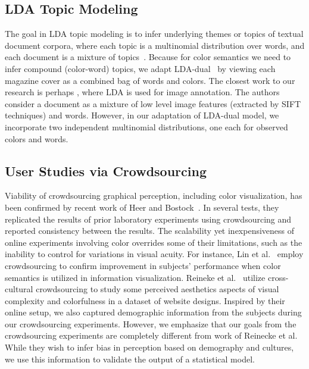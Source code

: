 \documentclass[prodmode,acmtochi]{acmsmall}
\begin{document}
\subsection{LDA Topic Modeling}

The goal in LDA topic modeling is to infer underlying themes or topics
of textual document corpora, where each topic is a multinomial
distribution over words, and each document is a mixture of
topics~\cite{blei2003latent,Blei:2012:PTM}.
Because for color semantics we need to infer compound (color-word) topics, we adapt LDA-dual~\cite{shu2009latent} by viewing each magazine cover as a combined bag of words
and colors.  The closest work to our research is perhaps
\cite{feng2010topic}, where LDA is used for image annotation.  The authors
consider a document as a mixture of low level image features (extracted
by SIFT techniques) and words.  However, in our adaptation of LDA-dual model, we
incorporate two independent multinomial distributions, one each for observed colors and words.

\subsection{User Studies via Crowdsourcing}

Viability of crowdsourcing graphical perception, including color
visualization, has been confirmed by recent work of Heer and
Bostock~\cite{heer2010crowdsourcing}.  In several tests, they replicated
the results of prior laboratory experiments using crowdsourcing and
reported consistency between the results.  The scalability yet
inexpensiveness of online experiments involving color overrides some of their
limitations, such as the inability to control for variations in visual acuity.  For instance, Lin et
al.~\cite{linSemantically2013} employ crowdsourcing to confirm
improvement in subjects' performance when color semantics is utilized in
information visualization.  Reineke et
al.~\cite{reinecke2013predicting,reinecke2014} utilize cross-cultural
crowdsourcing to study some perceived aesthetics aspects of visual
complexity and colorfulness in a dataset of website designs.  Inspired
by their online setup, we also captured demographic information from the subjects during our
crowdsourcing experiments. However, we emphasize that our goals from
the crowdsourcing experiments are completely different from work of Reinecke et al.  While they wish
to infer bias in perception based on demography and cultures, we use this information to validate the output of a statistical model.
\end{document}
